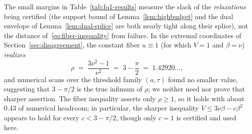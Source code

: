 \begin{remark}
The small margins in Table~\ref{tab:fq1-results} measure the slack of the \emph{relaxations} being certified (the support bound of Lemma~\ref{lem:highbudget} and the dual envelope of Lemma~\ref{lem:dual-splice} are both nearly tight along their splice), not the distance of~\eqref{eq:fiber-inequality} from failure. In the extremal coordinates of Section~\ref{sec:disagreement}, the constant fiber $u\equiv1$ (for which $V=1$ and $\beta=\nu$) \emph{realizes}
\[
        \rho\;=\;\frac{3\nu^2-1}{\nu^2}\;=\;3-\frac{\pi}{2}\;=\;1.42920\ldots,
\]
and numerical scans over the threshold family $(a,\tau)$ found no smaller value, suggesting that $3-\pi/2$ is the true infimum of $\rho$; we neither need nor prove that sharper assertion. The fiber inequality asserts only $\rho\ge1$, so it holds with about $0.43$ of numerical headroom; in particular, the sharper inequality $V\le3\nu\beta-c\beta^2$ appears to hold for every $c<3-\pi/2$, though only $c=1$ is certified and used here.
\end{remark}